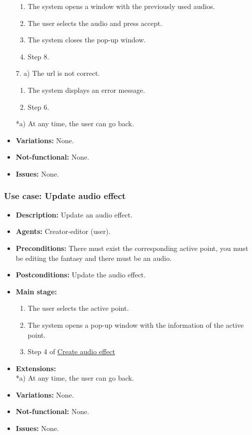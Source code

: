 \begin{itemize}
\begin{enumerate}
		\item The system opens a window with the previously used audios.
		\item The user selects the audio and press accept.
		\item The system closes the pop-up window.
		\item Step 8.
	\end{enumerate}
	7. a) The url is not correct.
	\begin{enumerate}
		\item The system displays an error message.
		\item Step 6.
	\end{enumerate}
	*a) At any time, the user can go back.
	\item \textbf{Variations:} None.
	\item \textbf{Not-functional:} None.
	\item \textbf{Issues:} None.
\end{itemize}

\subsubsection{Use case: Update audio effect}
\begin{itemize}
	\item \textbf{Description:} Update an audio effect.
	\item \textbf{Agents:} Creator-editor (user).
	\item \textbf{Preconditions:} There must exist the corresponding active point, you must be editing the fantasy and there must be an audio.
	\item \textbf{Postconditions:} Update the audio effect.
	\item \textbf{Main stage:}
	\begin{enumerate}
		\item The user selects the active point.
		\item The system opens a pop-up window with the information of the active point.
		\item Step 4 of \hyperlink{crearaudio}{Create audio effect}
	\end{enumerate}
	\item \textbf{Extensions:} \\ *a) At any time, the user can go back.
	\item \textbf{Variations:} None.
	\item \textbf{Not-functional:} None.
	\item \textbf{Issues:} None.
\end{itemize}

